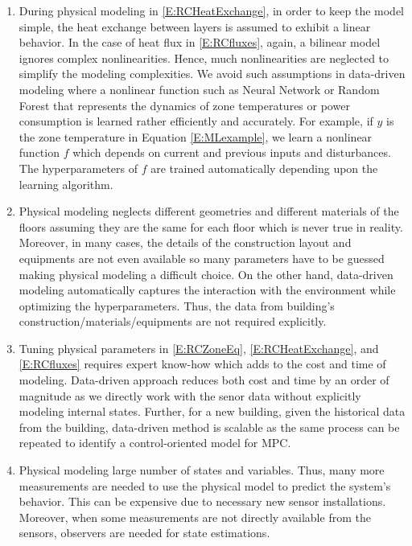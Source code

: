 \begin{enumerate}
	\item \textcolor[rgb]{0,0,1}{
	During physical modeling in \eqref{E:RCHeatExchange}, in order to keep the model simple, the heat exchange between layers is assumed to exhibit a linear behavior. 
	In the case of heat flux in \eqref{E:RCfluxes}, again, a bilinear model ignores complex nonlinearities.
	Hence, much nonlinearities are neglected to simplify the modeling complexities.
	We avoid such assumptions in data-driven modeling where a nonlinear function such as Neural Network or Random Forest that represents the dynamics of zone temperatures or power consumption is learned rather efficiently and accurately. 
	For example, if \(y\) is the zone temperature in Equation \eqref{E:MLexample}, we learn a nonlinear function \(f\) which depends on current and previous inputs and disturbances. 
	The hyperparameters of \(f\) are trained automatically depending upon the learning algorithm.}
	\item \textcolor[rgb]{0,0,1}{
	Physical modeling neglects different geometries and different materials of the floors assuming they are the same for each floor which is never true in reality.
	Moreover, in many cases, the details of the construction layout and equipments are not even available so many parameters have to be guessed making physical modeling a difficult choice.
	On the other hand, data-driven modeling automatically captures the interaction with the environment while optimizing the hyperparameters. Thus, the data from building's construction/materials/equipments are not required explicitly.}
	\item \textcolor[rgb]{0,0,1}{
	Tuning physical parameters in \eqref{E:RCZoneEq}, \eqref{E:RCHeatExchange}, and \eqref{E:RCfluxes} requires expert know-how which adds to the cost and time of modeling.
	Data-driven approach reduces both cost and time by an order of magnitude as we directly work with the senor data without explicitly modeling internal states.
	Further, for a new building, given the historical data from the building, data-driven method is scalable as the same process can be repeated to identify a control-oriented model for MPC.}
	\item \textcolor[rgb]{0,0,1}{
	Physical modeling large number of states and variables.
	Thus, many more measurements are needed to use the physical model to predict the system's behavior.
	This can be expensive due to necessary new sensor installations.
	Moreover, when some measurements are not directly available from the sensors, observers are needed for state estimations.
}
\end{enumerate}
